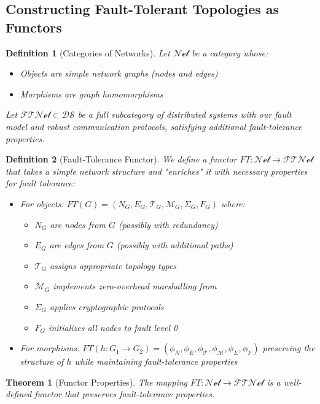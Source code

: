 \documentclass{article}
\newtheorem{theorem}{Theorem}
\newtheorem{definition}{Definition}
\begin{document}
\subsection{Constructing Fault-Tolerant Topologies as Functors}

\begin{definition}[Categories of Networks]
Let $\mathcal{Net}$ be a category whose:
\begin{itemize}
\item Objects are simple network graphs (nodes and edges)
\item Morphisms are graph homomorphisms
\end{itemize}

Let $\mathcal{FTNet} \subset \mathcal{DS}$ be a full subcategory of distributed systems with our fault model and robust communication protocols, satisfying additional fault-tolerance properties.
\end{definition}

\begin{definition}[Fault-Tolerance Functor]
We define a functor $FT: \mathcal{Net} \to \mathcal{FTNet}$ that takes a simple network structure and "enriches" it with necessary properties for fault tolerance:
\begin{itemize}
\item For objects: $FT(G) = (N_G, E_G, \mathcal{T}_G, \mathcal{M}_G, \Sigma_G, F_G)$ where:
\begin{itemize}
\item $N_G$ are nodes from $G$ (possibly with redundancy)
\item $E_G$ are edges from $G$ (possibly with additional paths)
\item $\mathcal{T}_G$ assigns appropriate topology types
\item $\mathcal{M}_G$ implements zero-overhead marshalling from \cite{obinexus2025marshalling}
\item $\Sigma_G$ applies cryptographic protocols
\item $F_G$ initializes all nodes to fault level 0
\end{itemize}
\item For morphisms: $FT(h: G_1 \to G_2) = (\phi_N, \phi_E, \phi_\mathcal{T}, \phi_\mathcal{M}, \phi_\Sigma, \phi_F)$ preserving the structure of $h$ while maintaining fault-tolerance properties
\end{itemize}
\end{definition}

\begin{theorem}[Functor Properties]
The mapping $FT: \mathcal{Net} \to \mathcal{FTNet}$ is a well-defined functor that preserves fault-tolerance properties.
\end{theorem}
\end{document}
